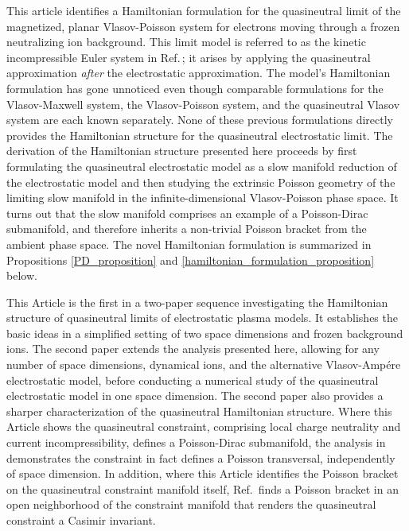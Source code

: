 \documentclass[%
 aip,
 amsmath,amssymb,
reprint, onecolumn %
]{revtex4-1}
\begin{document}
This article identifies a Hamiltonian formulation for the quasineutral limit of the magnetized, planar Vlasov-Poisson system for electrons moving through a frozen neutralizing ion background. This limit model is referred to as the kinetic incompressible Euler system in Ref.\,; it arises by applying the quasineutral approximation \emph{after} the electrostatic approximation. The model's Hamiltonian formulation has gone unnoticed even though comparable formulations for the Vlasov-Maxwell system\cite{p_j_morrison_maxwell-vlasov_1980,j_e_marsden_hamiltonian_1982,morrisonPoissonBracketsFluids1982}, the Vlasov-Poisson system\cite{l_a_turski_canonical_1976,p_j_morrison_maxwell-vlasov_1980,j_gibbons_collisionless_1981}, and the quasineutral Vlasov system\cite{c_tronci_neutral_2015,j_w_burby_chasing_2015} are each known separately. None of these previous formulations directly provides the Hamiltonian structure for the quasineutral electrostatic limit. The derivation of the Hamiltonian structure presented here proceeds by first formulating the quasineutral electrostatic model as a slow manifold reduction\cite{a_n_gorban_constructive_2004,r_s_mackay_slow_2004,j_w_burby_slow_2020} of the electrostatic model and then studying the extrinsic Poisson geometry\cite{a_weinstein_local_1983,vaisman_lectures_1994} of the limiting slow manifold in the infinite-dimensional Vlasov-Poisson phase space. It turns out that the slow manifold comprises an example of a Poisson-Dirac submanifold\cite{crainic_integrability_2004}, and therefore inherits a non-trivial Poisson bracket from the ambient phase space. The novel Hamiltonian formulation is summarized in Propositions \ref{PD_proposition} and \ref{hamiltonian_formulation_proposition} below.

This Article is the first in a two-paper sequence investigating the Hamiltonian structure of quasineutral limits of electrostatic plasma models. It establishes the basic ideas in a simplified setting of two space dimensions and frozen background ions. The second paper \cite{Kaltsas_2025} extends the analysis presented here, allowing for any number of space dimensions, dynamical ions, and the alternative Vlasov-Amp\'ere electrostatic model, before conducting a numerical study of the quasineutral electrostatic model in one space dimension. The second paper also provides a sharper characterization of the quasineutral Hamiltonian  structure. Where this Article shows the quasineutral constraint, comprising local charge neutrality and current incompressibility, defines a Poisson-Dirac submanifold, the analysis in  demonstrates the constraint in fact defines a Poisson transversal, independently of space dimension. In addition, where this Article identifies the Poisson bracket on the quasineutral constraint manifold itself, Ref.\, finds a Poisson bracket in an open neighborhood of the constraint manifold that renders the quasineutral constraint a Casimir invariant.
\end{document}
